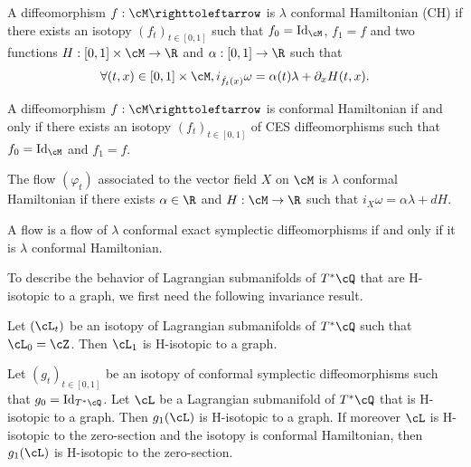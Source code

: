 \begin{definition}
A diffeomorphism $f: \cM \righttoleftarrow$ is $\lambda$ conformal Hamiltonian (CH) if there exists an isotopy $(f_t)_{t\in[0, 1]}$ such that $f_0={\rm Id}_\cM$, $f_1=f$ and two functions $H:[0, 1]\times \cM\to \R$ and $\alpha:[0, 1]\to \R$ such that
\[
\forall (t, x)\in [0, 1]\times \cM, i_{\dot f_t(x)}\omega=\alpha(t)\lambda+\partial_xH(t, x).
\]
\end{definition}

\begin{remark}
A diffeomorphism $f: \cM \righttoleftarrow$ is conformal Hamiltonian if and only if there exists an isotopy $(f_t)_{t\in[0, 1]}$ of CES diffeomorphisms such that $f_0={\rm Id}_\cM$ and $f_1=f$.
\end{remark}

\begin{definition}
The flow $(\varphi_t)$ associated to the vector field $X$ on $\cM$ is $\lambda$ conformal Hamiltonian if there exists $\alpha\in \R$ and $H:\cM\to \R$ such that $i_X\omega=\alpha \lambda +dH$.
\end{definition}

\begin{remark}
A flow is a flow of $\lambda$ conformal exact symplectic diffeomorphisms if and only if it is $\lambda$ conformal Hamiltonian.
\end{remark}

To describe the behavior of Lagrangian submanifolds of $T^*\cQ$ that are H-isotopic to a graph, we first need the following invariance result.
\begin{proposition}
\label{Pisotopytograph}
Let $(\cL_t)$ be an isotopy of Lagrangian submanifolds of $T^*\cQ$ such that $\cL_0=\cZ$. Then $\cL_1$ is H-isotopic to a graph.
\end{proposition}

\begin{corollary}
\label{PHisotopytograph}
Let $(g_t)_{t\in[0, 1]}$ be an isotopy of conformal symplectic diffeomorphisms such that $g_0={\rm Id}_{T^*\cQ}$. Let $\cL$ be a Lagrangian submanifold of $T^*\cQ$ that is H-isotopic to a graph. Then $g_1(\cL)$ is H-isotopic to a graph. 
If moreover $\cL$ is H-isotopic to the zero-section and the isotopy is conformal Hamiltonian, then $g_1(\cL)$ is H-isotopic to the zero-section.
\end{corollary}

